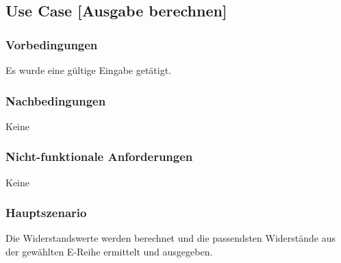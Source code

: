\subsection{Use Case [Ausgabe berechnen]}

\subsubsection{Vorbedingungen}
Es wurde eine gültige Eingabe getätigt.

\subsubsection{Nachbedingungen}
Keine

\subsubsection{Nicht-funktionale Anforderungen}
Keine

\subsubsection{Hauptszenario}
Die Widerstandswerte werden berechnet und die passendsten Widerstände aus der gewählten E-Reihe ermittelt und ausgegeben.
%
%

